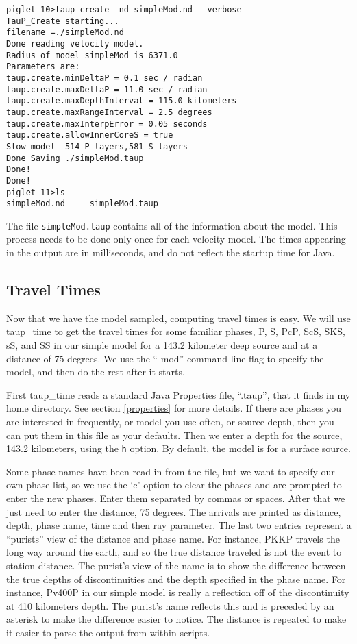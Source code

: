 \begin{verbatim}
piglet 10>taup_create -nd simpleMod.nd --verbose
TauP_Create starting...
filename =./simpleMod.nd
Done reading velocity model.
Radius of model simpleMod is 6371.0
Parameters are:
taup.create.minDeltaP = 0.1 sec / radian
taup.create.maxDeltaP = 11.0 sec / radian
taup.create.maxDepthInterval = 115.0 kilometers
taup.create.maxRangeInterval = 2.5 degrees
taup.create.maxInterpError = 0.05 seconds
taup.create.allowInnerCoreS = true
Slow model  514 P layers,581 S layers
Done Saving ./simpleMod.taup
Done!
Done!
piglet 11>ls
simpleMod.nd     simpleMod.taup
\end{verbatim}

The file \texttt{simpleMod.taup} contains all of the information about the
model. This process needs to be done only once for each velocity model.
The times appearing in the output are in milliseconds, and do not reflect the
startup time for Java.

\subsection{Travel Times}

Now that we have the model sampled, computing travel times is easy.
We will use taup\_time to get the travel times for some familiar phases, 
P, S, PcP, ScS, SKS, sS, and SS 
in our simple model for a 143.2 kilometer deep 
source and at a distance of 75 degrees. We use the ``-mod'' command line
flag to specify the model, and then do the rest after it starts.

First taup\_time reads a standard Java Properties file, ``.taup'', 
that it finds in my home directory. See section \ref{properties} for 
more details.
If there are phases you are interested in frequently, or model you use often,
or source depth, then you can put them in this file as your defaults.
Then we enter a depth for the source, 143.2 kilometers, using the \texttt{h}
option. By default, the model is for a surface source.

Some phase names have been read in from the file, but
we want to specify our own phase list, so we use the `c' option
to clear the phases and are prompted to enter the new phases. Enter them 
separated by commas or spaces. After that we just need to enter the distance,
75 degrees. The arrivals are printed as distance, depth, phase name, time and then
ray parameter. 
The last two entries represent a ``purists'' view of the distance and phase name. For instance, PKKP travels the long way around the earth, and so the 
true distance traveled is not the event to station distance. The purist's 
view of the name is to show the difference between the true depths of discontinuities and the depth specified in the phase name. For instance, 
Pv400P in our simple model is really a reflection off of the discontinuity 
at 410 kilometers depth. The purist's name reflects this and is preceded 
by an asterisk to make the difference easier to notice. 
The distance is repeated to make it easier to parse the output
from within scripts.

